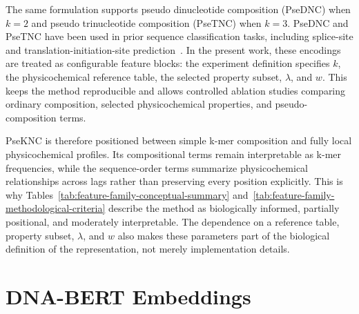 The same formulation supports pseudo dinucleotide composition (PseDNC) when $k=2$ and pseudo trinucleotide composition (PseTNC) when $k=3$. PseDNC and PseTNC have been used in prior sequence classification tasks, including splice-site and translation-initiation-site prediction~\citep{chen2014isspsednc,chen2014itispsetnc}. In the present work, these encodings are treated as configurable feature blocks: the experiment definition specifies $k$, the physicochemical reference table, the selected property subset, $\lambda$, and $w$. This keeps the method reproducible and allows controlled ablation studies comparing ordinary composition, selected physicochemical properties, and pseudo-composition terms.

PseKNC is therefore positioned between simple k-mer composition and fully local physicochemical profiles. Its compositional terms remain interpretable as k-mer frequencies, while the sequence-order terms summarize physicochemical relationships across lags rather than preserving every position explicitly. This is why Tables~\ref{tab:feature-family-conceptual-summary} and~\ref{tab:feature-family-methodological-criteria} describe the method as biologically informed, partially positional, and moderately interpretable. The dependence on a reference table, property subset, $\lambda$, and $w$ also makes these parameters part of the biological definition of the representation, not merely implementation details.

\section{DNA-BERT Embeddings}\label{sec:features-dnabert}

